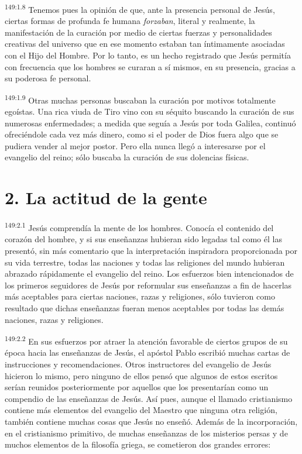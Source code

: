 \par 
\textsuperscript{149:1.8} Tenemos pues la opinión de que, ante la presencia personal de Jesús, ciertas formas de profunda fe humana \textit{forzaban}, literal y realmente, la manifestación de la curación por medio de ciertas fuerzas y personalidades creativas del universo que en ese momento estaban tan íntimamente asociadas con el Hijo del Hombre. Por lo tanto, es un hecho registrado que Jesús permitía con frecuencia que los hombres se curaran a sí mismos, en su presencia, gracias a su poderosa fe personal.

\par 
\textsuperscript{149:1.9} Otras muchas personas buscaban la curación por motivos totalmente egoístas. Una rica viuda de Tiro vino con su séquito buscando la curación de sus numerosas enfermedades; a medida que seguía a Jesús por toda Galilea, continuó ofreciéndole cada vez más dinero, como si el poder de Dios fuera algo que se pudiera vender al mejor postor. Pero ella nunca llegó a interesarse por el evangelio del reino; sólo buscaba la curación de sus dolencias físicas.

\section*{2. La actitud de la gente}
\par 
\textsuperscript{149:2.1} Jesús comprendía la mente de los hombres. Conocía el contenido del corazón del hombre, y si sus enseñanzas hubieran sido legadas tal como él las presentó, sin más comentario que la interpretación inspiradora proporcionada por su vida terrestre, todas las naciones y todas las religiones del mundo hubieran abrazado rápidamente el evangelio del reino. Los esfuerzos bien intencionados de los primeros seguidores de Jesús por reformular sus enseñanzas a fin de hacerlas más aceptables para ciertas naciones, razas y religiones, sólo tuvieron como resultado que dichas enseñanzas fueran menos aceptables por todas las demás naciones, razas y religiones.

\par 
\textsuperscript{149:2.2} En sus esfuerzos por atraer la atención favorable de ciertos grupos de su época hacia las enseñanzas de Jesús, el apóstol Pablo escribió muchas cartas de instrucciones y recomendaciones. Otros instructores del evangelio de Jesús hicieron lo mismo, pero ninguno de ellos pensó que algunos de estos escritos serían reunidos posteriormente por aquellos que los presentarían como un compendio de las enseñanzas de Jesús. Así pues, aunque el llamado cristianismo contiene más elementos del evangelio del Maestro que ninguna otra religión, también contiene muchas cosas que Jesús no enseñó. Además de la incorporación, en el cristianismo primitivo, de muchas enseñanzas de los misterios persas y de muchos elementos de la filosofía griega, se cometieron dos grandes errores:

